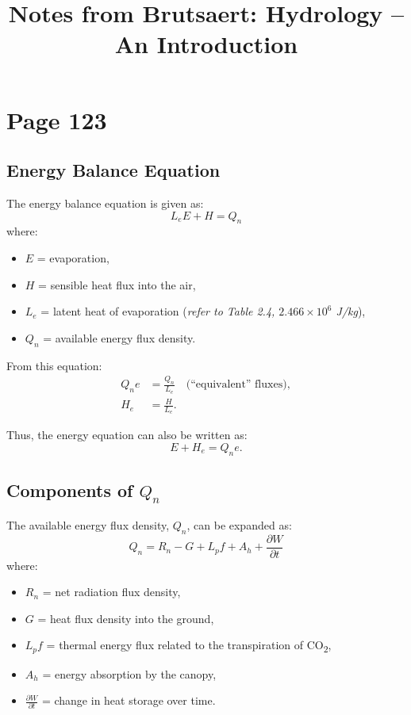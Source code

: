 \documentclass[11pt]{article}
\title{Notes from Brutsaert: Hydrology -- An Introduction}
\author{}
\date{}
\begin{document}
	
	\maketitle
	
	\section*{Page 123}
	
	\subsection*{Energy Balance Equation}
	The energy balance equation is given as:
	\begin{equation}
		L_e E + H = Q_n \tag{4.13}
	\end{equation}
	where:
	\begin{itemize}
		\item $E$ = evaporation,
		\item $H$ = sensible heat flux into the air,
		\item $L_e$ = latent heat of evaporation (\textit{refer to Table 2.4, $2.466 \times 10^6$ J/kg}),
		\item $Q_n$ = available energy flux density.
	\end{itemize}
	
	From this equation:
	\begin{align*}
		Q_n e &= \frac{Q_n}{L_e} \quad \text{(``equivalent'' fluxes)}, \\
		H_e &= \frac{H}{L_e}.
	\end{align*}
	
	Thus, the energy equation can also be written as:
	\[
	E + H_e = Q_n e.
	\]
	
	\subsection*{Components of $Q_n$}
	The available energy flux density, $Q_n$, can be expanded as:
	\begin{equation}
		Q_n = R_n - G + L_p f + A_h + \frac{\partial W}{\partial t} \tag{4.14}
	\end{equation}
	where:
	\begin{itemize}
		\item $R_n$ = net radiation flux density,
		\item $G$ = heat flux density into the ground,
		\item $L_p f$ = thermal energy flux related to the transpiration of CO\textsubscript{2},
		\item $A_h$ = energy absorption by the canopy,
		\item $\frac{\partial W}{\partial t}$ = change in heat storage over time.
	\end{itemize}
	
\end{document}
